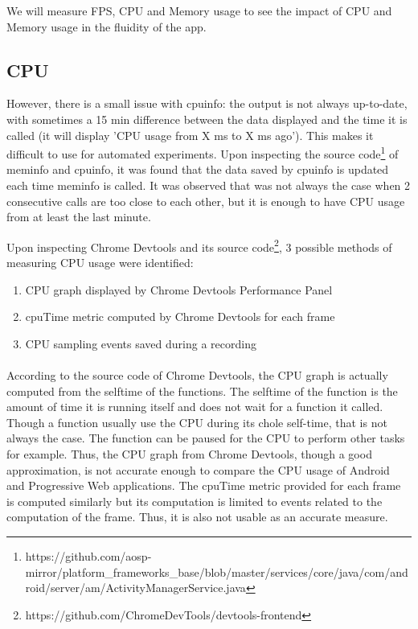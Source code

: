We will measure FPS, CPU and Memory usage to see the impact of CPU and Memory usage in the fluidity of the app.
\newline

\subsection{CPU}


However, there is a small issue with cpuinfo: the output is not always up-to-date, with sometimes a 15 min difference between the data displayed and the time it is called (it will display 'CPU usage from X ms to X ms ago'). This makes it difficult to use for automated experiments. Upon inspecting the source code\footnote{https://github.com/aosp-mirror/platform\_frameworks\_base/blob/master/services/core/java/com/android/server/am/ActivityManagerService.java} of meminfo and cpuinfo, it was found that the data saved by cpuinfo is updated each time meminfo is called. It was observed that was not always the case when 2 consecutive calls are too close to each other, but it is enough to have CPU usage from at least the last minute.

Upon inspecting Chrome Devtools and its source code\footnote{https://github.com/ChromeDevTools/devtools-frontend}, 3 possible methods of measuring CPU usage were identified:
\begin{enumerate}
    \item CPU graph displayed by Chrome Devtools Performance Panel
    \item cpuTime metric computed by Chrome Devtools for each frame
    \item CPU sampling events saved during a recording
\end{enumerate}

\paragraph{}
According to the source code of Chrome Devtools, the CPU graph is actually computed from the selftime of the functions. The selftime of the function is the amount of time it is running itself and does not wait for a function it called. Though a function usually use the CPU during its chole self-time, that is not always the case. The function can be paused for the CPU to perform other tasks for example. Thus, the CPU graph from Chrome Devtools, though a good approximation, is not accurate enough to compare the CPU usage of Android and Progressive Web applications. \newline
The cpuTime metric provided for each frame is computed similarly but its computation is limited to events related to the computation of the frame. Thus, it is also not usable as an accurate measure.

